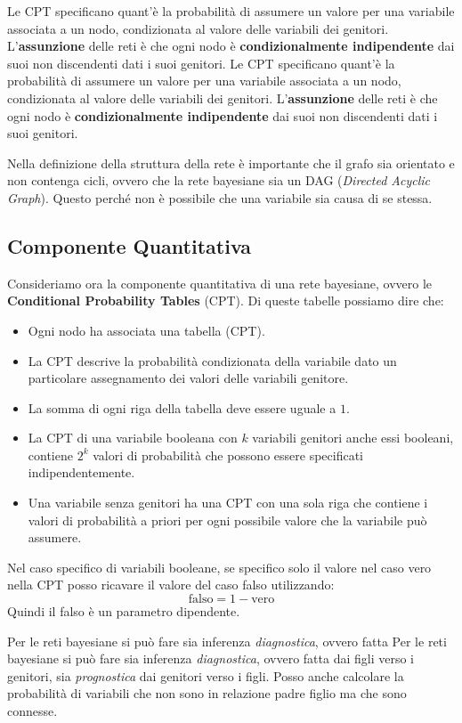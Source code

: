 Le CPT specificano quant'è la probabilità di assumere un valore per una variabile
associata a un nodo, condizionata al valore delle variabili dei genitori.
L'\textbf{assunzione} delle reti è che ogni nodo è \textbf{condizionalmente
    indipendente} dai suoi non discendenti dati i suoi genitori.
Le CPT specificano quant'è la probabilità di assumere un valore per una variabile
associata a un nodo, condizionata al valore delle variabili dei genitori.
L'\textbf{assunzione} delle reti è che ogni nodo è \textbf{condizionalmente
    indipendente} dai suoi non discendenti dati i suoi genitori.

Nella definizione della struttura della rete è importante che il grafo sia orientato
e non contenga cicli, ovvero che la rete bayesiane sia un DAG (\textit{Directed
    Acyclic Graph}). Questo perché non è possibile che una variabile sia causa
di se stessa.
\subsection{Componente Quantitativa}
Consideriamo ora la componente quantitativa di una rete bayesiane, ovvero le
\textbf{Conditional Probability Tables} (CPT). Di queste tabelle possiamo dire che:
\begin{itemize}
    \item Ogni nodo ha associata una tabella (CPT).
    \item La CPT descrive la probabilità condizionata della variabile dato un
          particolare assegnamento dei valori delle variabili genitore.
    \item La somma di ogni riga della tabella deve essere uguale a $1$.
    \item La CPT di una variabile booleana con $k$ variabili genitori anche essi
          booleani, contiene $2^k$ valori di probabilità che possono essere
          specificati indipendentemente.
    \item Una variabile senza genitori ha una CPT con una sola riga che contiene
          i valori di probabilità a priori per ogni possibile valore che la
          variabile può assumere.
\end{itemize}
\begin{nota}
    Nel caso specifico di variabili booleane, se specifico solo il valore nel
    caso vero nella CPT posso ricavare il valore del caso falso utilizzando:
    \begin{equation*}
        \text{falso} = 1 - \text{vero}
    \end{equation*}
    Quindi il falso è un parametro dipendente.
\end{nota}
Per le reti bayesiane si può fare sia inferenza \textit{diagnostica}, ovvero fatta
Per le reti bayesiane si può fare sia inferenza \textit{diagnostica}, ovvero fatta
dai figli verso i genitori, sia \textit{prognostica} dai genitori verso i figli.
Posso anche calcolare la probabilità di variabili che non sono in relazione padre
figlio ma che sono connesse.
